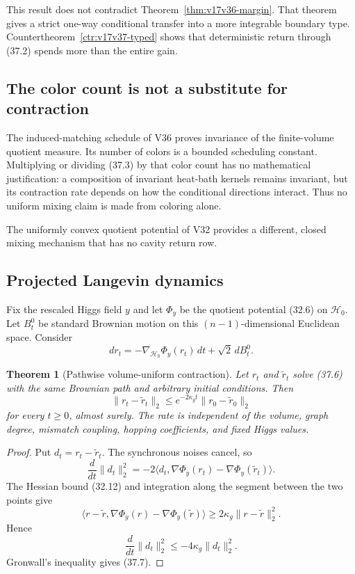 \documentclass[11pt]{article}
\newtheorem{theorem}{Theorem}[section]
\theoremstyle{remark}
\begin{document}
This result does not contradict Theorem~\ref{thm:v17v36-margin}.
That theorem gives a strict one-way conditional transfer into a more
integrable boundary type.  Countertheorem~\ref{ctr:v17v37-typed} shows
that deterministic return through (37.2) spends more than the entire
gain.

\subsection{The color count is not a substitute for contraction}

The induced-matching schedule of V36 proves invariance of the
finite-volume quotient measure.  Its number of colors is a bounded
scheduling constant.  Multiplying or dividing (37.3) by that color
count has no mathematical justification: a composition of invariant
heat-bath kernels remains invariant, but its contraction rate depends
on how the conditional directions interact.  Thus no uniform mixing
claim is made from coloring alone.

The uniformly convex quotient potential of V32 provides a different,
closed mixing mechanism that has no cavity return row.

\subsection{Projected Langevin dynamics}

Fix the rescaled Higgs field \(y\) and let \(\Phi_y\) be the quotient
potential (32.6) on \(\mathcal H_0\).  Let
\(B_t^0\) be standard Brownian motion on this \((n-1)\)-dimensional
Euclidean space.  Consider
\[
 dr_t=-\nabla_{\mathcal H_0}\Phi_y(r_t)\,dt
 +\sqrt2\,dB_t^0.                                  \tag{37.6}
\]

\begin{theorem}[Pathwise volume-uniform contraction]
\label{thm:v17v37-langevin}
Let \(r_t\) and \(\widetilde r_t\) solve (37.6) with the same Brownian
path and arbitrary initial conditions.  Then
\[
 \boxed{
 \|r_t-\widetilde r_t\|_2
 \leq e^{-2\kappa_gt}
 \|r_0-\widetilde r_0\|_2}                        \tag{37.7}
\]
for every \(t\geq0\), almost surely.  The rate is independent of the
volume, graph degree, mismatch coupling, hopping coefficients, and
fixed Higgs values.
\end{theorem}

\begin{proof}
Put \(d_t=r_t-\widetilde r_t\).  The synchronous noises cancel, so
\[
 \frac{d}{dt}\|d_t\|_2^2
 =-2\langle d_t,
 \nabla\Phi_y(r_t)-\nabla\Phi_y(\widetilde r_t)\rangle.          \tag{37.8}
\]
The Hessian bound (32.12) and integration along the segment between the
two points give
\[
 \langle r-\widetilde r,
 \nabla\Phi_y(r)-\nabla\Phi_y(\widetilde r)\rangle
 \geq2\kappa_g\|r-\widetilde r\|_2^2.              \tag{37.9}
\]
Hence
\[
 \frac{d}{dt}\|d_t\|_2^2
 \leq-4\kappa_g\|d_t\|_2^2.                       \tag{37.10}
\]
Gronwall's inequality gives (37.7).
\end{proof}
\end{document}
